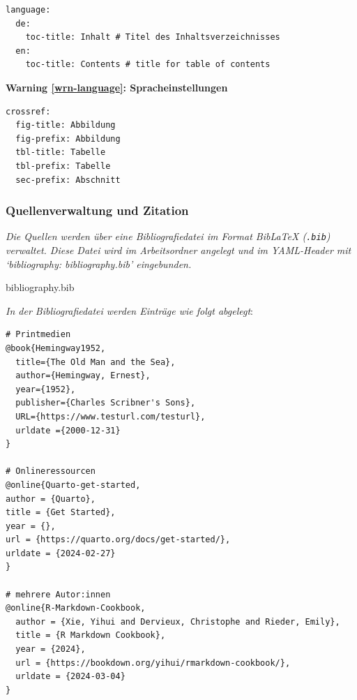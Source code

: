 \documentclass[
  letterpaper,
  DIV=11]{scrartcl}
\providecommand{\tightlist}{%
  \setlength{\itemsep}{0pt}\setlength{\parskip}{0pt}}\usepackage{longtable,booktabs,array}
\newcounter{quartocalloutwrnno}
\newcommand{\quartocalloutwrn}[1]{\refstepcounter{quartocalloutwrnno}\label{#1}}
\begin{document}
\begin{verbatim}
language:
  de:
    toc-title: Inhalt # Titel des Inhaltsverzeichnisses
  en:
    toc-title: Contents # title for table of contents
\end{verbatim}

\begin{tcolorbox}[enhanced jigsaw, opacityback=0, rightrule=.15mm, leftrule=.75mm, left=2mm, colback=white, bottomrule=.15mm, colframe=quarto-callout-warning-color-frame, breakable, toprule=.15mm, arc=.35mm]
\begin{minipage}[t]{5.5mm}
\textcolor{quarto-callout-warning-color}{\faExclamationTriangle}
\end{minipage}%
\begin{minipage}[t]{\textwidth - 5.5mm}

\quartocalloutwrn{wrn-language} 

\vspace{-3mm}\textbf{Warning \ref*{wrn-language}: Spracheinstellungen}\vspace{3mm}

\begin{verbatim}
crossref: 
  fig-title: Abbildung
  fig-prefix: Abbildung
  tbl-title: Tabelle
  tbl-prefix: Tabelle
  sec-prefix: Abschnitt
\end{verbatim}

\end{minipage}%
\end{tcolorbox}

\subsubsection{Quellenverwaltung und
Zitation}\label{quellenverwaltung-und-zitation}

\emph{Die Quellen werden über eine Bibliografiedatei im Format BibLaTeX
(\texttt{.bib}) verwaltet. Diese Datei wird im Arbeitsordner angelegt
und im YAML-Header mit `bibliography: bibliography.bib' eingebunden.}

\begin{description}
\tightlist
\item[Bibliografiedatei]
bibliography.bib
\end{description}

\emph{In der Bibliografiedatei werden Einträge wie folgt abgelegt}:

\begin{verbatim}
# Printmedien
@book{Hemingway1952,
  title={The Old Man and the Sea},
  author={Hemingway, Ernest},
  year={1952},
  publisher={Charles Scribner's Sons},
  URL={https://www.testurl.com/testurl},
  urldate ={2000-12-31}
}

# Onlineressourcen
@online{Quarto-get-started,
author = {Quarto},
title = {Get Started},
year = {},
url = {https://quarto.org/docs/get-started/},
urldate = {2024-02-27}
}

# mehrere Autor:innen
@online{R-Markdown-Cookbook,
  author = {Xie, Yihui and Dervieux, Christophe and Rieder, Emily},
  title = {R Markdown Cookbook},
  year = {2024},
  url = {https://bookdown.org/yihui/rmarkdown-cookbook/},
  urldate = {2024-03-04}
}
\end{verbatim}
\end{document}
